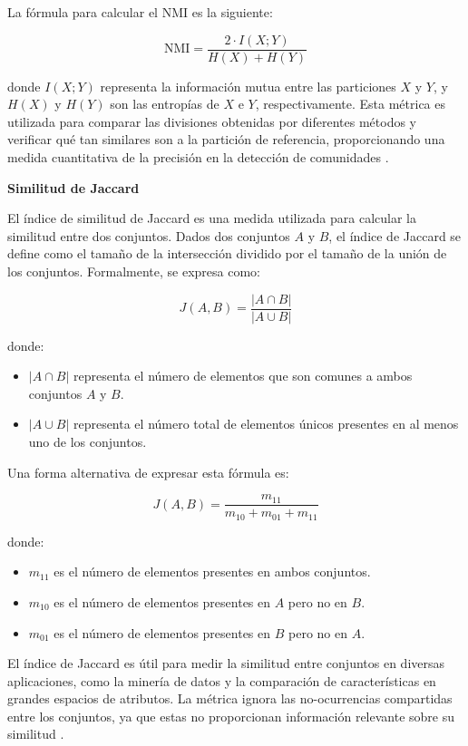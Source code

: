 \documentclass[11pt,a4paper,twoside,openany]{tesis}
\begin{document}
La fórmula para calcular el NMI es la siguiente:

\[
\text{NMI} = \frac{2 \cdot I(X; Y)}{H(X) + H(Y)}
\]

donde \( I(X; Y) \) representa la información mutua entre las particiones \(X\) y \(Y\), y \( H(X) \) y \( H(Y) \) son las entropías de \(X\) e \(Y\), respectivamente. Esta métrica es utilizada para comparar las divisiones obtenidas por diferentes métodos y verificar qué tan similares son a la partición de referencia, proporcionando una medida cuantitativa de la precisión en la detección de comunidades \cite{nmi}.

\textbf{Similitud de Jaccard}

El índice de similitud de Jaccard es una medida utilizada para calcular la similitud entre dos conjuntos. Dados dos conjuntos \( A \) y \( B \), el índice de Jaccard se define como el tamaño de la intersección dividido por el tamaño de la unión de los conjuntos. Formalmente, se expresa como:

\[
J(A, B) = \frac{|A \cap B|}{|A \cup B|}
\]

donde:
\begin{itemize}
    \item \( |A \cap B| \) representa el número de elementos que son comunes a ambos conjuntos \( A \) y \( B \).
    \item \( |A \cup B| \) representa el número total de elementos únicos presentes en al menos uno de los conjuntos.
\end{itemize}

Una forma alternativa de expresar esta fórmula es:

\[
J(A, B) = \frac{m_{11}}{m_{10} + m_{01} + m_{11}}
\]

donde:
\begin{itemize}
    \item \( m_{11} \) es el número de elementos presentes en ambos conjuntos.
    \item \( m_{10} \) es el número de elementos presentes en \( A \) pero no en \( B \).
    \item \( m_{01} \) es el número de elementos presentes en \( B \) pero no en \( A \).
\end{itemize}

El índice de Jaccard es útil para medir la similitud entre conjuntos en diversas aplicaciones, como la minería de datos y la comparación de características en grandes espacios de atributos. La métrica ignora las no-ocurrencias compartidas entre los conjuntos, ya que estas no proporcionan información relevante sobre su similitud \cite{jaccard}.
\end{document}
